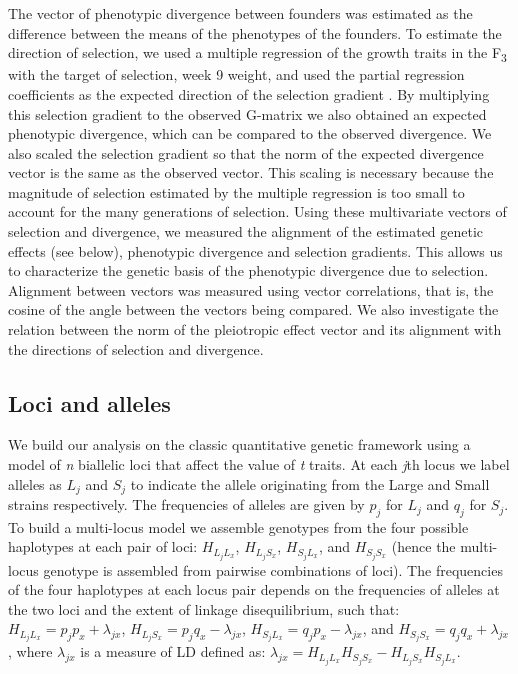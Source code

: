 \begin{refsection}
The vector of phenotypic divergence between founders was estimated as
the difference between the means of the phenotypes of the founders. To
estimate the direction of selection, we used a multiple regression of
the growth traits in the F\textsubscript{3} with the target of
selection, week 9 weight, and used the partial regression coefficients
as the expected direction of the selection gradient \parencite{Lande1983-ez}. By multiplying this
selection gradient to the observed G-matrix we also obtained an expected
phenotypic divergence, which can be compared to the observed divergence.
We also scaled the selection gradient so that the norm of the expected
divergence vector is the same as the observed vector. This scaling is
necessary because the magnitude of selection estimated by the multiple
regression is too small to account for the many generations of
selection. Using these multivariate vectors of selection and divergence,
we measured the alignment of the estimated genetic effects (see below), phenotypic
divergence and selection gradients. This allows us to characterize the 
genetic basis of the phenotypic divergence due to selection. Alignment between vectors was measured
using vector correlations, that is, the cosine of the angle between the
vectors being compared. We also investigate the relation between the
norm of the pleiotropic effect vector and its alignment with the
directions of selection and divergence.

\subsection{Loci and alleles}

We build our analysis on the classic quantitative genetic framework
using a model of \emph{n} biallelic loci that affect the value of
\emph{t} traits. At each \emph{j}th locus we label alleles
as \(L_{j}\) and \(S_{j}\) to indicate the allele originating from the Large
and Small strains respectively. The frequencies of alleles are given
by \(p_{j}\) for \(L_{j}\) and \(q_{j}\) for \(S_{j}\). To build a multi-locus
model we assemble genotypes from the four possible haplotypes at each
pair of loci: \(H_{L_{j}L_{x}}\), \(H_{L_{j}S_{x}}\), \(H_{S_{j}L_{x}}\), and \(H_{S_{j}S_{x}}\) (hence
the multi-locus genotype is assembled from pairwise combinations of
loci). The frequencies of the four haplotypes at each locus pair depends
on the frequencies of alleles at the two loci and the extent of linkage
disequilibrium, such
that: \(H_{L_{j}L_{x}} = p_{j}p_{x} + \lambda_{jx}\), \(H_{L_{j}S_{x}} = p_{j}q_{x} - \lambda_{jx}\), \(H_{S_{j}L_{x}} = q_{j}p_{x} - \lambda_{jx}\), and \(H_{S_{j}S_{x}} = q_{j}q_{x} + \lambda_{jx}\), where \(\lambda_{jx}\) is a measure of LD defined as: \(\lambda_{jx} = H_{L_{j}L_{x}}H_{S_{j}S_{x}} - H_{L_{j}S_{x}}H_{S_{j}L_{x}}\).


\end{refsection}
